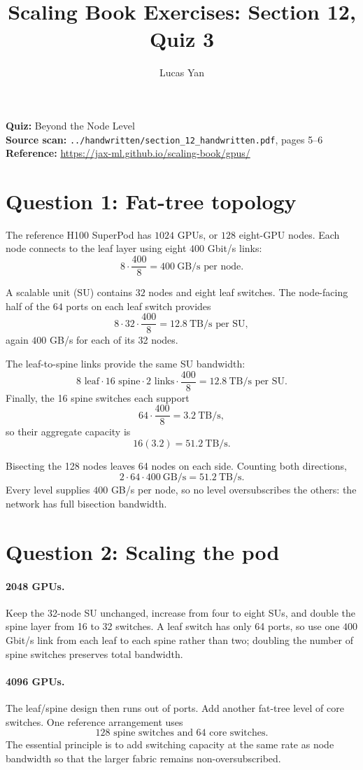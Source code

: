 \documentclass[11pt]{article}
\title{Scaling Book Exercises: Section 12, Quiz 3}
\author{Lucas Yan}
\date{}
\begin{document}
\maketitle

\noindent
\textbf{Quiz:} Beyond the Node Level\\
\textbf{Source scan:} \texttt{../handwritten/section\_12\_handwritten.pdf},
pages 5--6\\
\textbf{Reference:} \url{https://jax-ml.github.io/scaling-book/gpus/}

\section*{Question 1: Fat-tree topology}

The reference H100 SuperPod has \(1024\) GPUs, or \(128\) eight-GPU nodes.
Each node connects to the leaf layer using eight \(400\) Gbit/s links:
\[
8\cdot\frac{400}{8}
=\boxed{400\ \text{GB/s per node}}.
\]

A scalable unit (SU) contains \(32\) nodes and eight leaf switches.  The
node-facing half of the \(64\) ports on each leaf switch provides
\[
8\cdot32\cdot\frac{400}{8}
=\boxed{12.8\ \text{TB/s per SU}},
\]
again \(400\) GB/s for each of its 32 nodes.

The leaf-to-spine links provide the same SU bandwidth:
\[
8\text{ leaf}\cdot16\text{ spine}\cdot2\text{ links}
\cdot\frac{400}{8}
=\boxed{12.8\ \text{TB/s per SU}}.
\]
Finally, the 16 spine switches each support
\[
64\cdot\frac{400}{8}=3.2\ \text{TB/s},
\]
so their aggregate capacity is
\[
16(3.2)=\boxed{51.2\ \text{TB/s}}.
\]

Bisecting the 128 nodes leaves 64 nodes on each side.  Counting both
directions,
\[
2\cdot64\cdot400\ \text{GB/s}
=\boxed{51.2\ \text{TB/s}}.
\]
Every level supplies \(400\) GB/s per node, so no level oversubscribes the
others: the network has full bisection bandwidth.

\section*{Question 2: Scaling the pod}

\paragraph{2048 GPUs.}
Keep the 32-node SU unchanged, increase from four to eight SUs, and double
the spine layer from 16 to 32 switches.  A leaf switch has only 64 ports,
so use one \(400\) Gbit/s link from each leaf to each spine rather than two;
doubling the number of spine switches preserves total bandwidth.

\paragraph{4096 GPUs.}
The leaf/spine design then runs out of ports.  Add another fat-tree level
of core switches.  One reference arrangement uses
\[
\boxed{128\text{ spine switches and }64\text{ core switches}.}
\]
The essential principle is to add switching capacity at the same rate as
node bandwidth so that the larger fabric remains non-oversubscribed.
\end{document}
